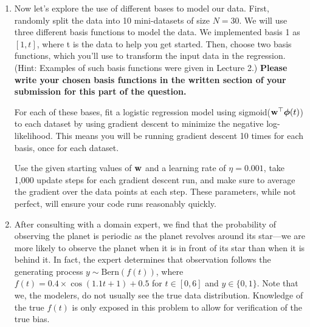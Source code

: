 \documentclass[submit]{../harvardml}
\begin{document}
\begin{problem}
\begin{enumerate}
\begin{enumerate}
    \item Show that the first term from our final expression in part (b) represents the noise in our data, i.e. $\mathbb{E}_{y|\mathbf{x}}[(y - f(\mathbf{x}))^2] = \sigma^2$. 

    \item Define the average predictor $\bar f(\mathbf{x}) = \mathbb{E}_\mathcal{D}[\hat f_\mathcal{D}(\mathbf{x})]$. Now show that the the second term from our final expression in part (b) represents the squared bias plus variance, i.e. $\mathbb{E}_\mathcal{D}[(f(\mathbf{x}) - \hat f_\mathcal{D}(\mathbf{x}))^2] = (f(\mathbf{x}) - \bar f(\mathbf{x}))^2 + \mathbb{E}_\mathcal{D}[(\bar f(\mathbf{x}) - \hat f_\mathcal{D}(\mathbf{x}))^2]$. 
\end{enumerate}

  \item Now let's explore the use of different bases to model our data. First, randomly split the data into 10 mini-datasets of size $N = 30$. We will use three different basis functions to model the data. We implemented basis 1 as $[1,t]$, where t is the data to help you get started. Then, choose two basis functions, which you'll use to transform the input data in the regression. (Hint: Examples of such basis functions were given in Lecture 2.) \textbf{Please write your chosen basis functions in the written section of your submission for this part of the question. }
  
  For each of these bases, fit a logistic regression model using sigmoid($\mathbf{w}^\top \boldsymbol\phi(t)$) to each dataset by using gradient descent to
        minimize the negative log-likelihood.  This means you will be
        running gradient descent 10 times for each basis, once for each
        dataset.

        Use the given starting values of $\mathbf{w}$ and a learning rate of $\eta=0.001$, take 1,000 update
        steps for each gradient descent run, and make sure to average the
        gradient over the data points at each step. These parameters,
        while not perfect, will ensure your code runs reasonably quickly.
  
  \item After consulting with a domain expert, we find that the probability of observing the planet is periodic as the planet revolves around its star---we are more likely to observe the planet when it is in front of its star than when it is behind it. In fact, the expert determines that observation follows the generating process $y \sim \text{Bern}(f(t))$, where $f(t) = 0.4 \times \cos(1.1t + 1) + 0.5$ for $t \in [0, 6]$ and $y \in \{0,1\}$. Note that we, the modelers, do not usually see the true data distribution. Knowledge of the true $f(t)$ is only exposed in this problem to allow for verification of the true bias.


\end{enumerate}
\end{problem}
\end{document}
